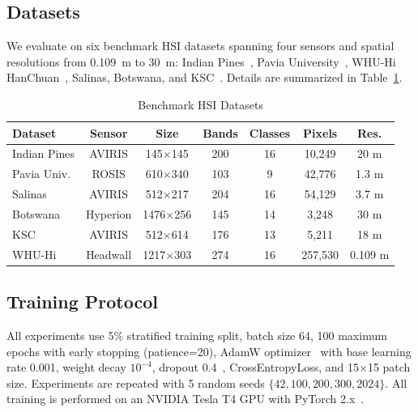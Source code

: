 \documentclass[pdflatex,sn-mathphys-num]{sn-jnl}
\theoremstyle{thmstyleone}
\theoremstyle{thmstyletwo}
\theoremstyle{thmstylethree}
\begin{document}
\subsection{Datasets}

We evaluate on six benchmark HSI datasets spanning four sensors and spatial resolutions from 0.109~m to 30~m: Indian Pines~\cite{baumgardner2015indian}, Pavia University~\cite{gamba2004pavia}, WHU-Hi HanChuan~\cite{zhong2020whu}, Salinas, Botswana, and KSC~\cite{gic2020hyperspectral}. Details are summarized in Table~\ref{tab:datasets}.

\begin{table}[!t]
\caption{Benchmark HSI Datasets}
\label{tab:datasets}
\centering

\begin{tabular}{lcccccc}
\toprule
\textbf{Dataset} & \textbf{Sensor} & \textbf{Size} & \textbf{Bands} & \textbf{Classes} & \textbf{Pixels} & \textbf{Res.} \\
\midrule
Indian Pines & AVIRIS & 145$\times$145 & 200 & 16 & 10,249 & 20 m \\
Pavia Univ. & ROSIS & 610$\times$340 & 103 & 9 & 42,776 & 1.3 m \\
Salinas & AVIRIS & 512$\times$217 & 204 & 16 & 54,129 & 3.7 m \\
Botswana & Hyperion & 1476$\times$256 & 145 & 14 & 3,248 & 30 m \\
KSC & AVIRIS & 512$\times$614 & 176 & 13 & 5,211 & 18 m \\
WHU-Hi & Headwall & 1217$\times$303 & 274 & 16 & 257,530 & 0.109 m \\
\bottomrule
\end{tabular}
\end{table}

\subsection{Training Protocol}

All experiments use 5\% stratified training split, batch size 64, 100 maximum epochs with early stopping (patience=20), AdamW optimizer~\cite{loshchilov2019decoupled} with base learning rate 0.001, weight decay $10^{-4}$, dropout 0.4~\cite{srivastava2014dropout}, CrossEntropyLoss, and 15$\times$15 patch size. Experiments are repeated with 5 random seeds $\{42, 100, 200, 300, 2024\}$. All training is performed on an NVIDIA Tesla T4 GPU with PyTorch 2.x~\cite{paszke2019pytorch}.

\end{document}
